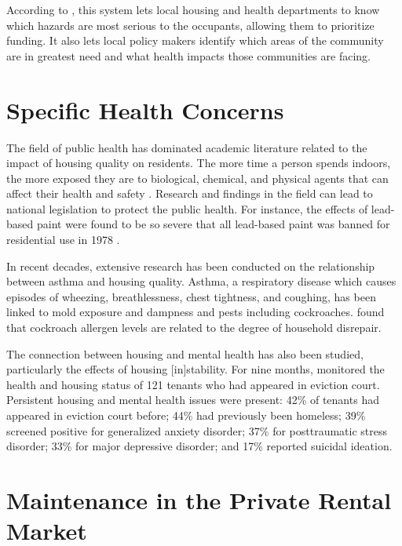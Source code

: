 \documentclass[
]{book}
\begin{document}
According to \citet{HHRSover}, this system lets local housing and health departments to know which hazards are most serious to the occupants, allowing them to prioritize funding. It also lets local policy makers identify which areas of the community are in greatest need and what health impacts those communities are facing.

\hypertarget{specific-health-concerns}{%
\section{Specific Health Concerns}\label{specific-health-concerns}}

The field of public health has dominated academic literature related to the impact of housing quality on residents. The more time a person spends indoors, the more exposed they are to biological, chemical, and physical agents that can affect their health and safety \citep[ 63]{cdc2006}. Research and findings in the field can lead to national legislation to protect the public health. For instance, the effects of lead-based paint were found to be so severe that all lead-based paint was banned for residential use in 1978 \citep{cdc2020}.

In recent decades, extensive research has been conducted on the relationship between asthma and housing quality. Asthma, a respiratory disease which causes episodes of wheezing, breathlessness, chest tightness, and coughing, has been linked to mold exposure and dampness \citep{mendell2011} and pests including cockroaches. \citet{rauh2002} found that cockroach allergen levels are related to the degree of household disrepair.

The connection between housing and mental health has also been studied, particularly the effects of housing {[}in{]}stability. For nine months, \citet{tsai2020} monitored the health and housing status of 121 tenants who had appeared in eviction court. Persistent housing and mental health issues were present: 42\% of tenants had appeared in eviction court before; 44\% had previously been homeless; 39\% screened positive for generalized anxiety disorder; 37\% for posttraumatic stress disorder; 33\% for major depressive disorder; and 17\% reported suicidal ideation.

\hypertarget{maintenance-in-the-private-rental-market}{%
\section{Maintenance in the Private Rental Market}\label{maintenance-in-the-private-rental-market}}
\end{document}
